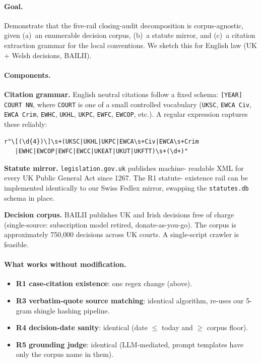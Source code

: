 \paragraph{Goal.} Demonstrate that the five-rail closing-audit decomposition
is corpus-agnostic, given (a)~an enumerable decision corpus, (b)~a statute
mirror, and (c)~a citation extraction grammar for the local conventions.
We sketch this for English law (UK + Welsh decisions, BAILII).

\paragraph{Components.}

\textbf{Citation grammar.} English neutral citations follow a fixed
schema: \texttt{[YEAR] COURT NN}, where \texttt{COURT} is one of a small
controlled vocabulary (\texttt{UKSC}, \texttt{EWCA Civ}, \texttt{EWCA
Crim}, \texttt{EWHC}, \texttt{UKHL}, \texttt{UKPC}, \texttt{EWFC},
\texttt{EWCOP}, etc.). A regular expression captures these reliably:
\begin{verbatim}
r"\[(\d{4})\]\s+(UKSC|UKHL|UKPC|EWCA\s+Civ|EWCA\s+Crim
   |EWHC|EWCOP|EWFC|EWCC|UKEAT|UKUT|UKFTT)\s+(\d+)"
\end{verbatim}

\textbf{Statute mirror.} \texttt{legislation.gov.uk} publishes machine-
readable XML for every UK Public General Act since 1267. The R1 statute-
existence rail can be implemented identically to our Swiss Fedlex
mirror, swapping the \texttt{statutes.db} schema in place.

\textbf{Decision corpus.} BAILII publishes UK and Irish decisions free
of charge (single-source: subscription model retired, donate-as-you-go).
The corpus is approximately 750{,}000 decisions across UK courts. A
single-script crawler is feasible.

\paragraph{What works without modification.}
\begin{itemize}
\item \textbf{R1 case-citation existence}: one regex change (above).
\item \textbf{R3 verbatim-quote source matching}: identical algorithm,
re-uses our 5-gram shingle hashing pipeline.
\item \textbf{R4 decision-date sanity}: identical (date $\leq$ today and
$\geq$ corpus floor).
\item \textbf{R5 grounding judge}: identical (LLM-mediated, prompt
templates have only the corpus name in them).
\end{itemize}


